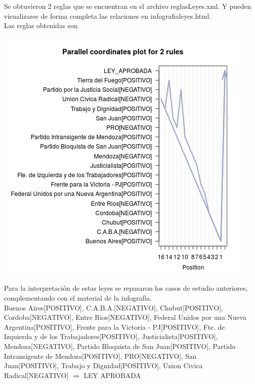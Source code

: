 \documentclass{endm}
\begin{document}
Se obtuvieron 2 reglas que se encuentran en el archivo reglasLeyes.xml. Y pueden visualizarse de forma completa las relaciones en infografialeyes.html.\\

Las reglas obtenidas son \\

\begin{center}
\includegraphics[scale=0.5]{graficos/paracoordLeyes.png} \\
\end{center} 

Para la interpretación de estas leyes se repasaron los casos de estudio anteriores, complementando con el material de la infografía. \\

{Buenos Aires[POSITIVO],                    
C.A.B.A.[NEGATIVO],                         
Chubut[POSITIVO],                           
Cordoba[NEGATIVO],                          
Entre Rios[NEGATIVO],                       
Federal Unidos por una Nueva Argentina[POSITIVO],                       
Frente para la Victoria - PJ[POSITIVO],     
Fte. de Izquierda y de los Trabajadores[POSITIVO],  
Justicialista[POSITIVO],                    
Mendoza[NEGATIVO],  
Partido Bloquista de San Juan[POSITIVO],    
Partido Intransigente de Mendoza[POSITIVO], 
PRO[NEGATIVO], 
San Juan[POSITIVO],
Trabajo y Dignidad[POSITIVO],            
Union Civica Radical[NEGATIVO]}                 $\Longrightarrow$ {LEY APROBADA} \\
\end{document}
